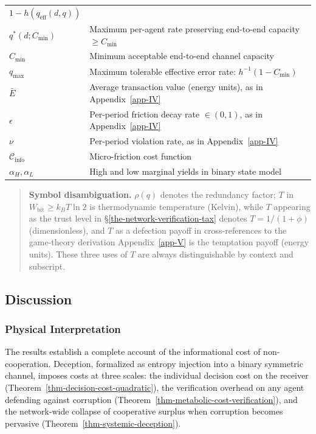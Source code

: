 \documentclass[11pt]{article}
\theoremstyle{plain}
\theoremstyle{definition}
\theoremstyle{remark}
\let\origsubsection\subsection
\renewcommand{\subsection}{\needspace{7\baselineskip}\origsubsection}
\let\origsubsubsection\subsubsection
\renewcommand{\subsubsection}{\needspace{4\baselineskip}\origsubsubsection}
\begin{document}
{\begin{longtable}[]{@{}
  >{\raggedright\arraybackslash}p{}
  >{\raggedright\arraybackslash}p{}@{}}
\(1 - h(q_{\text{eff}}(d, q))\) \\
\(q^*(d; C_{\min})\) & Maximum per-agent rate preserving end-to-end
capacity \(\geq C_{\min}\) \\
\(C_{\min}\) & Minimum acceptable end-to-end channel capacity \\
\(q_{\max}\) & Maximum tolerable effective error rate:
\(h^{-1}(1 - C_{\min})\) \\
\(\bar{E}\) & Average transaction value (energy units), as in
Appendix~\ref{app-IV} \\
\(\epsilon\) & Per-period friction decay rate \(\in (0,1)\), as in
Appendix~\ref{app-IV} \\
\(\nu\) & Per-period violation rate, as in Appendix~\ref{app-IV} \\
\(\mathcal{C}_{\text{info}}\) & Micro-friction cost function \\
\(\alpha_H, \alpha_L\) & High and low marginal yields in binary state
model \\
\end{longtable}
}

\begin{quote}
\textbf{Symbol disambiguation.} \(\rho(q)\) denotes the redundancy
factor; \(T\) in \(W_{\text{bit}} \geq k_B T \ln 2\) is thermodynamic
temperature (Kelvin), while \(T\) appearing as the trust level in
§\ref{the-network-verification-tax} denotes \(T = 1/(1+\phi)\)
(dimensionless), and \(T\) as a defection payoff in cross-references to
the game-theory derivation Appendix~\ref{app-V} is the temptation payoff
(energy units). These three uses of \(T\) are always distinguishable by
context and subscript.
\end{quote}

\subsection{Discussion}\label{discussion-1}

\subsubsection{Physical Interpretation}\label{physical-interpretation-2}

The results establish a complete account of the informational cost of
non-cooperation. Deception, formalized as entropy injection into a
binary symmetric channel, imposes costs at three scales: the individual
decision cost on the receiver
(Theorem~\ref{thm-decision-cost-quadratic}), the verification overhead
on any agent defending against corruption
(Theorem~\ref{thm-metabolic-cost-verification}), and the network-wide
collapse of cooperative surplus when corruption becomes pervasive
(Theorem~\ref{thm-systemic-deception}).
\end{document}
